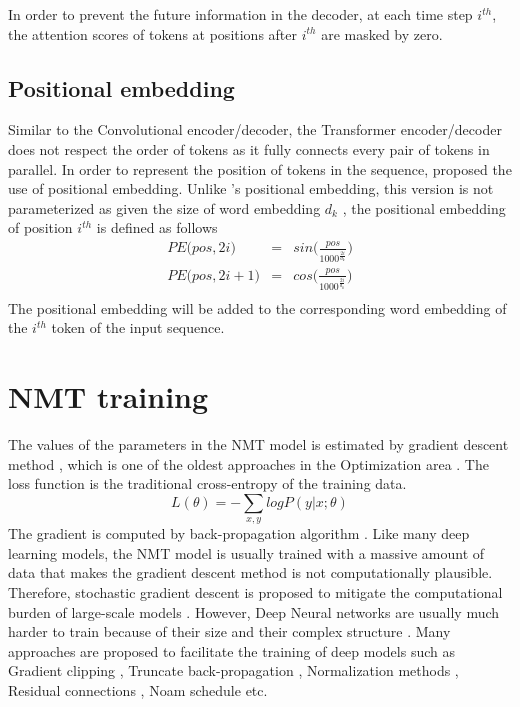 In order to prevent the future information in the decoder, at each time step $i^{th}$, the attention scores of tokens at positions after $i^{th}$ are masked by zero.

\subsection{Positional embedding}
Similar to the Convolutional encoder/decoder, the Transformer encoder/decoder does not respect the order of tokens as it fully connects every pair of tokens in parallel. In order to represent the position of tokens in the sequence, \cite{Vaswani17attention} proposed the use of positional embedding. Unlike \citet{Ghering17convolutional}'s positional embedding, this version is not parameterized as given the size of word embedding $d_k$ , the positional embedding of position $i^{th}$ is defined as follows
\begin{equation}
\begin{array}{rcl}
PE\big(pos,2i\big) &=& sin \big( \frac{pos}{1000^{\frac{2i}{d_k}}} \big)\\
PE\big(pos,2i+1\big) &=& cos \big( \frac{pos}{1000^{\frac{2i}{d_k}}} \big)\\
\end{array}
\end{equation}
The positional embedding will be added to the corresponding word embedding of the $i^{th}$ token of the input sequence.
\section{NMT training} \label{sec:train}
The values of the parameters in the NMT model is estimated by gradient descent method \citep{Nesterov14introductory}, which is one of the oldest approaches in the Optimization area \citep{Cauchy1847method}. The loss function is the traditional cross-entropy of the training data. 
\begin{equation}
L(\theta) = -\displaystyle{\mathop{\sum}_{x,y}}log P(y|x;\theta)
\end{equation}
The gradient is computed by back-propagation algorithm \citep{Rumelhart88learning}. Like many deep learning models, the NMT model is usually trained with a massive amount of data that makes the gradient descent method is not computationally plausible. Therefore, stochastic gradient descent is proposed to mitigate the computational burden of large-scale models \citep{Herbert51stochastic,Kiefer52stochastic,Bottou10large}. However, Deep Neural networks are usually much harder to train because of their size and their complex structure \cite{Pascanu13onthe,Glorot10understanding}. Many approaches are proposed to facilitate the training of deep models such as Gradient clipping \citep{Pascanu13onthe}, Truncate back-propagation \citep{Jaeger02tutorial}, Normalization methods \citep{Ioffe15batch,Jimmy16layer}, Residual connections \citep{He16deep}, Noam schedule \citep{Vaswani17attention} etc.

